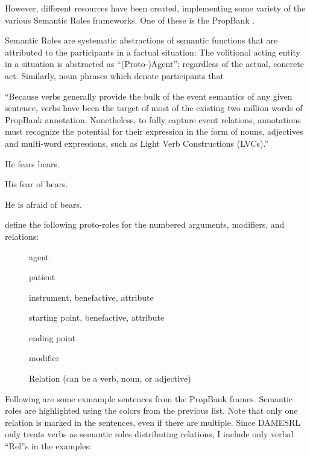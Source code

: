 However, different resources have been created, implementing some variety of the various Semantic Roles frameworks.
One of these is the PropBank \citep{kingsbury2002treebank}.


Semantic Roles are systematic abstractions of semantic functions that are attributed to the participants
in a factual situation: The volitional acting entity in a situation is abstracted as ``(Proto-)Agent''; regardless
of the actual, concrete act. Similarly, noun phrases which denote participants that

``Because verbs generally provide the bulk of the event semantics of any given sentence, verbs have
been the target of most of the existing two million words of PropBank annotation. Nonetheless,
to fully capture event relations, annotations must recognize the potential for their expression
in the form of nouns, adjectives and multi-word expressions, such as Light Verb Constructions
(LVCs).'' \citep[p.~3014]{bonial2014propbank}

\begin{examples}
  \item He fears bears.
  \item His fear of bears.
  \item He is afraid of bears.
\end{examples}

\cite{bonial2012english} define the following proto-roles for the numbered arguments, modifiers,
and relations:

\begin{description}
  \item[] agent
  \item[] patient
  \item[] instrument, benefactive, attribute
  \item[] starting point, benefactive, attribute
  \item[] ending point
  \item[] modifier
  \item[] Relation (can be a verb, noun, or adjective)
\end{description}

Following are some exmample sentences from the PropBank frames. Semantic roles are
highlighted using the colors from the previous list. Note that only one relation is marked in the
sentences, even if there are multiple. Since DAMESRL only treats verbs as semantic roles distributing
relations, I include only verbal ``Rel''s in the examples:

